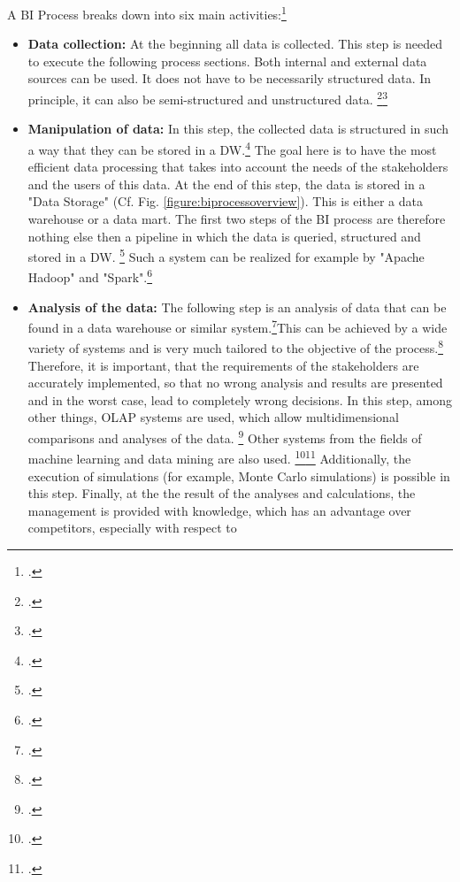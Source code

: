 A \ac{BI} Process breaks down into six main activities:\footcite[Cf.][Fig. 2]{foley2010business}
\begin{itemize}
    \item \textbf{Data collection: }At the beginning all data is collected. This step is needed to execute the following
    process sections. Both internal and external data sources can be used. It does not have to be
    necessarily structured data. In principle, it can also be semi-structured and unstructured data.
    \footcite[Cf.][p. 465]{ranjan2008business}\footcite[Cf.][p. 3]{hartmann2016capturing}
    \item \textbf{Manipulation of data: }In this step, the collected data is structured in such a way that
    they can be stored in a \ac{DW}.\footcite[Cf.][p. 463]{ranjan2008business} The goal here is to have the most
    efficient data processing that takes into account the needs of the stakeholders and the users of this data.
    At the end of this step, the data is stored in a "Data Storage" (Cf. Fig. \ref{figure:biprocessoverview}).
    This is either a data warehouse or a data mart. The first two steps of the \ac{BI} process are therefore nothing else then a
    pipeline in which the data is queried, structured and stored in a \ac{DW}.
    \footcite[Cf.][p. 466]{ranjan2008business} Such a system can be realized for example by "Apache Hadoop" and
    "Spark".\footcite[Cf.][p. 65]{rahman2015big}
    \item \textbf{Analysis of the data: }The following step is an analysis of data that can be found in a data warehouse or similar
    system.\footcite[Cf.][p. 16]{kasemsap2016fundamentals}This can be achieved by a wide variety of systems
    and is very much tailored to the objective of the process.\footcite[Cf.][p. 21]{niu2009cognition} Therefore, it is important,
    that the requirements of the stakeholders are accurately implemented, so that no wrong analysis and results are presented and in the worst case,
    lead to completely wrong decisions. In this step, among other things, \ac{OLAP}
    systems are used, which allow multidimensional comparisons and analyses of the data.
    \footcite[Cf.][pp. 107]{hovcevar2010assessing} Other systems from the fields of machine learning and data mining are also used.
    \footcite[Cf.][p. 11]{foley2010business}\footcite[Cf.][p. 80]{yeoh2008managing} Additionally, the
    execution of simulations (for example, Monte Carlo simulations) is possible in this step. Finally, at the
    the result of the analyses and calculations, the management is provided with knowledge, which has an advantage over competitors, especially with respect to

\end{itemize}
